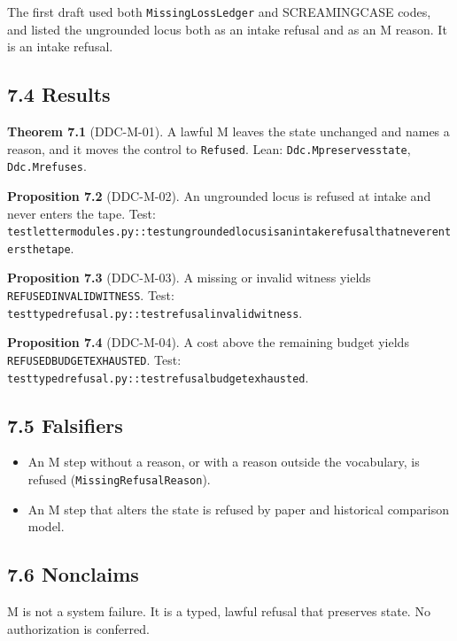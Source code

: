 \documentclass[
  11pt,
]{article}
\newenvironment{Shaded}{}{}
\newcommand{\NormalTok}[1]{#1}
\providecommand{\tightlist}{%
  \setlength{\itemsep}{0pt}\setlength{\parskip}{0pt}}
\renewcommand{\_}{\ddcunderscore\allowbreak}
\begin{document}
The first draft used both \texttt{Missing\allowbreak Loss\allowbreak Ledger} and SCREAMING\_CASE
codes, and listed the ungrounded locus both as an intake refusal and as
an M reason. It is an intake refusal.

\subsection{7.4 Results}\label{results-6}

\textbf{Theorem 7.1} (DDC-M-01). A lawful M leaves the state unchanged
and names a reason, and it moves the control to \texttt{Refused}. Lean:
\texttt{Ddc.\allowbreak M\_preserves\_state}, \texttt{Ddc.\allowbreak M\_refuses}.

\textbf{Proposition 7.2} (DDC-M-02). An ungrounded locus is refused at
intake and never enters the tape. Test:
\texttt{test\_letter\_modules.\allowbreak py::test\_ungrounded\_locus\_is\_an\_intake\_refusal\_that\_never\_enters\_the\_tape}.

\textbf{Proposition 7.3} (DDC-M-03). A missing or invalid witness yields
\texttt{REFUSED\_INVALID\_WITNESS}. Test:
\texttt{test\_typed\_refusal.\allowbreak py::test\_refusal\_invalid\_witness}.

\textbf{Proposition 7.4} (DDC-M-04). A cost above the remaining budget
yields \texttt{REFUSED\_BUDGET\_EXHAUSTED}. Test:
\texttt{test\_typed\_refusal.\allowbreak py::test\_refusal\_budget\_exhausted}.

\subsection{7.5 Falsifiers}\label{falsifiers-6}

\begin{itemize}
\tightlist
\item
  An M step without a reason, or with a reason outside the vocabulary,
  is refused (\texttt{Missing\allowbreak Refusal\allowbreak Reason}).
\item
  An M step that alters the state is refused by paper and historical
  comparison model.
\end{itemize}

\subsection{7.6 Nonclaims}\label{nonclaims-6}

\begin{Shaded}
\begin{Highlighting}[]
\NormalTok{M is not a system failure. It is a typed, lawful refusal that preserves state.}
\NormalTok{No authorization is conferred.}
\end{Highlighting}
\end{Shaded}
\end{document}

